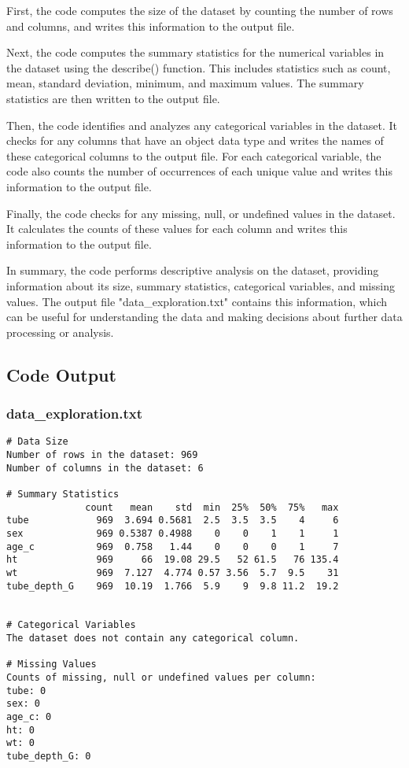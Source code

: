 \documentclass[11pt]{article}
\begin{document}
First, the code computes the size of the dataset by counting the number of rows and columns, and writes this information to the output file.

Next, the code computes the summary statistics for the numerical variables in the dataset using the describe() function. This includes statistics such as count, mean, standard deviation, minimum, and maximum values. The summary statistics are then written to the output file.

Then, the code identifies and analyzes any categorical variables in the dataset. It checks for any columns that have an object data type and writes the names of these categorical columns to the output file. For each categorical variable, the code also counts the number of occurrences of each unique value and writes this information to the output file.

Finally, the code checks for any missing, null, or undefined values in the dataset. It calculates the counts of these values for each column and writes this information to the output file.

In summary, the code performs descriptive analysis on the dataset, providing information about its size, summary statistics, categorical variables, and missing values. The output file "data\_exploration.txt" contains this information, which can be useful for understanding the data and making decisions about further data processing or analysis.

\subsection{Code Output}

\subsubsection*{data\_exploration.txt}

\begin{Verbatim}[tabsize=4]
# Data Size
Number of rows in the dataset: 969
Number of columns in the dataset: 6

# Summary Statistics
              count   mean    std  min  25%  50%  75%   max
tube            969  3.694 0.5681  2.5  3.5  3.5    4     6
sex             969 0.5387 0.4988    0    0    1    1     1
age_c           969  0.758   1.44    0    0    0    1     7
ht              969     66  19.08 29.5   52 61.5   76 135.4
wt              969  7.127  4.774 0.57 3.56  5.7  9.5    31
tube_depth_G    969  10.19  1.766  5.9    9  9.8 11.2  19.2


# Categorical Variables
The dataset does not contain any categorical column.

# Missing Values
Counts of missing, null or undefined values per column:
tube: 0
sex: 0
age_c: 0
ht: 0
wt: 0
tube_depth_G: 0

\end{Verbatim}
\end{document}
